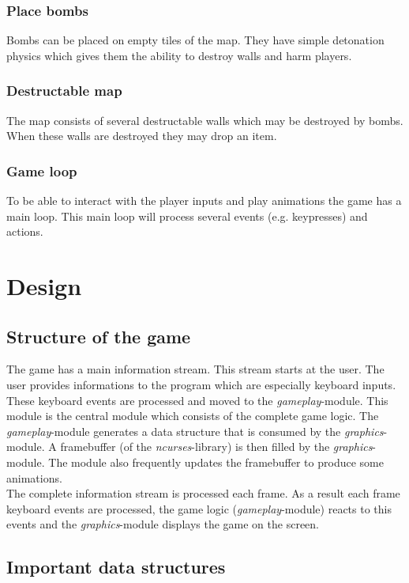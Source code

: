 \documentclass{article}
\begin{document}
			\subsubsection{Place bombs}
				Bombs can be placed on empty tiles of the map. They have simple detonation physics which gives them the ability to destroy walls and harm players.
			
			\subsubsection{Destructable map}
				The map consists of several destructable walls which may be destroyed by bombs. When these walls are destroyed they may drop an item.
			
			\subsubsection{Game loop}
				To be able to interact with the player inputs and play animations the game has a main loop. This main loop will process several events (e.g. keypresses) and actions.
	
	\section{Design}
		\subsection{Structure of the game}
			The game has a main information stream. This stream starts at the user. The user provides informations to the program which are especially keyboard inputs. These keyboard events are processed and moved to the \emph{gameplay}-module. This module is the central module which consists of the complete game logic. The \emph{gameplay}-module generates a data structure that is consumed by the \emph{graphics}-module. A framebuffer (of the \emph{ncurses}-library) is then filled by the \emph{graphics}-module. The module also frequently updates the framebuffer to produce some animations. \\
			
			The complete information stream is processed each frame. As a result each frame keyboard events are processed, the game logic (\emph{gameplay}-module) reacts to this events and the \emph{graphics}-module displays the game on the screen.
		
		\subsection{Important data structures}
\end{document}
